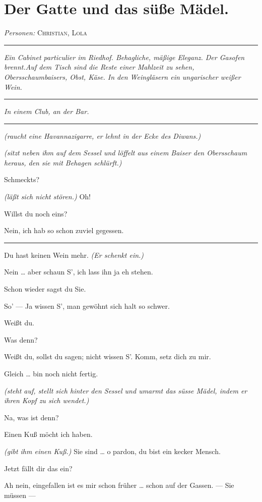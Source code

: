 \documentclass[
	final,
	a4paper,
	ngerman,
	mpinclude = true, %
	twoside = true,
	open = right,
	cleardoublepage = plain,
	DIV = 13,
	BCOR = 1cm,
	titlepage = firstiscover,
	]{scrbook}
\newcommand{\act}{\chapter}
\newcommand{\scene}{\section}
\newcommand{\direction}[1]{\textit{(#1)}}
\newcommand{\setting}[1]{\vspace{-0.5\baselineskip}\centering\textit{#1}}
\newenvironment{deletion}{%
		\vspace{0.25\baselineskip}
		\hrule
		\vspace{0.25\baselineskip}
		\color{darkgray}
	}{
		\color{black}
		\vspace{0.25\baselineskip}
		\hrule 
		\vspace{0.25\baselineskip}
	}
\newcommand{\characterlist}[1]{{\begin{center}\textit{Personen:} #1\end{center}}}
\newcommand{\thecharacter}[1]{\textup{\textsc{#1}}\xspace}
\newcommand{\thegatte}{\thecharacter{Christian}}
\newcommand{\thesuesse}{\thecharacter{Lola}}
\newcommand{\character}[1]{\item[#1:]}
\newcommand{\gatte}{\character{\thegatte}}
\newcommand{\suesse}{\character{\thesuesse}}
\begin{document}

\scene{Der Gatte und das süße Mädel.}
\characterlist{\thegatte, \thesuesse}
\begin{deletion}
\setting{Ein Cabinet particulier im Riedhof. Behagliche, mäßige Eleganz. Der Gasofen brennt.Auf dem Tisch sind die Reste einer Mahlzeit zu sehen, Obersschaumbaisers, Obst, Käse. In den Weingläsern ein ungarischer weißer Wein.}
\end{deletion}
\setting{In einem Club, an der Bar.}
\begin{play}
	\begin{deletion}
	\gatte
	\direction{raucht eine Havannazigarre, er lehnt in der Ecke des Diwans.}

	\suesse
	\direction{sitzt neben ihm auf dem Sessel und löffelt aus einem Baiser den Obersschaum heraus, den sie mit Behagen schlürft.}

	\gatte
	Schmeckts?

	\suesse
	\direction{läßt sich nicht stören.} Oh!

	\gatte
	Willst du noch eins?

	\suesse
	Nein, ich hab so schon zuviel gegessen.
	\end{deletion}

	\gatte
	Du hast keinen Wein mehr. \direction{Er schenkt ein.}

	\suesse
	Nein \ldots{} aber schaun S', ich lass ihn ja eh stehen.

	\gatte
	Schon wieder sagst du Sie.

	\suesse
	So' --- Ja wissen S', man gewöhnt sich halt so schwer.

	\gatte
	Weißt du.

	\suesse
	Was denn?

	\gatte
	Weißt du, sollst du sagen; nicht wissen S'. Komm, setz dich zu mir.

	\suesse
	Gleich \ldots{} bin noch nicht fertig.

	\gatte
	\direction{steht auf, stellt sich hinter den Sessel und umarmt das süsse Mädel, indem er ihren Kopf zu sich wendet.}

	\suesse
	Na, was ist denn?

	\gatte
	Einen Kuß möcht ich haben.

	\suesse
	\direction{gibt ihm einen Kuß.} Sie sind \ldots{} o pardon, du bist ein kecker Mensch.

	\gatte
	Jetzt fällt dir das ein?

	\suesse
	Ah nein, eingefallen ist es mir schon früher \ldots{} schon auf der Gassen. --- Sie müssen ---


\end{play}
\end{document}
